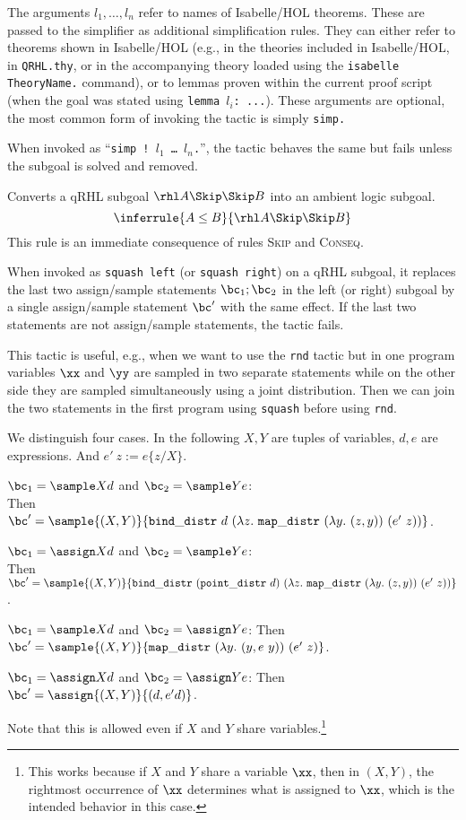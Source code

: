 \documentclass{article}
\renewcommand\rulerefx[1]{\hbox{\textsc{#1}}}
\begin{document}
The arguments $l_1,\dots,l_n$
refer to names of Isabelle/HOL theorems. These are passed to the
simplifier as additional simplification rules. They can either refer
to theorems shown in Isabelle/HOL (e.g., in the theories included in
Isabelle/HOL, in \texttt{QRHL.thy}, or in the accompanying theory
loaded using the \texttt{isabelle TheoryName.} command), or to lemmas
proven within the current proof script (when the goal was stated using
\texttt{\frenchspacing lemma $l_i$:
  ...}).  These arguments are optional, the most common form of
invoking the tactic is simply \texttt{simp.}


When invoked as ``\texttt{simp ! $l_1$
  \dots{} $l_n$.}'',
the tactic behaves the same but fails unless the subgoal is solved and
removed.



Converts a qRHL subgoal $\rhl A\Skip\Skip B$
into an ambient logic subgoal.
\[
\inferrule{
  A \leq B
}{
  \rhl A \Skip \Skip B
}
\]
This rule is an immediate consequence of rules \rulerefx{Skip} and \rulerefx{Conseq}.


When invoked as \texttt{squash left} (or \texttt{squash right}) on a
qRHL subgoal, it replaces the last two assign/sample statements $\bc_1;\bc_2$ in the
left (or right) subgoal by a single assign/sample statement $\bc'$ with the same effect.
If the last two statements are not assign/sample statements, the tactic fails.

This tactic is useful, e.g., when we want to use the \texttt{rnd}
tactic but in one program variables $\xx$ and $\yy$ are sampled in two
separate statements while on the other side they are sampled
simultaneously using a joint distribution. Then we can join the two
statements in the first program using \texttt{squash} before using
\texttt{rnd}.

We distinguish four cases.
In the following $X,Y$ are tuples of variables, $d,e$ are expressions.
And $e'\ z:=e\{z/X\}$.
\begin{compactitem}
\item $\bc_1=\sample X d$ and $\bc_2=\sample Y e$:\\
  Then $\bc'=\sample{(X,Y)}{\mathtt{bind\_distr}\ d\ (\lambda z.\ \mathtt{map\_distr}\ (\lambda y.\ (z,y))\ (e'\ z))}$.
\item $\bc_1=\assign X d$ and $\bc_2=\sample Y e$:\\
  Then $\bc'=\sample{(X,Y)}{\mathtt{bind\_distr}\ (\mathtt{point\_distr}\ d)\ (\lambda z.\ \mathtt{map\_distr}\ (\lambda y.\ (z,y))\ (e'\ z))}$.
\item $\bc_1=\sample X d$ and $\bc_2=\assign Y e$:
  Then $\bc'=\sample{(X,Y)}{\mathtt{map\_distr}\ (\lambda y.\ (y, e\ y))\ (e'\ z)}$.
\item $\bc_1=\assign X d$ and $\bc_2=\assign Y e$:
  Then $\bc'=\assign{(X,Y)}{(d, e' d)}$.
\end{compactitem}
Note that this is allowed even if $X$ and $Y$ share
variables.\footnote{This works because if $X$ and $Y$ share a variable $\xx$,
  then in $(X,Y)$, the rightmost occurrence of $\xx$ determines what is assigned to $\xx$,
  which is the intended behavior in this case.}
\end{document}
